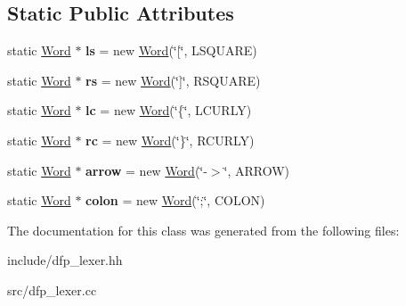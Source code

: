 \subsection*{Static Public Attributes}
\begin{DoxyCompactItemize}
\item 
static \hyperlink{class_d_f_p_1_1_word}{Word} $\ast$ {\bfseries ls} = new \hyperlink{class_d_f_p_1_1_word}{Word}(\char`\"{}\mbox{[}\char`\"{}, L\+S\+Q\+U\+A\+RE)\hypertarget{class_d_f_p_1_1_word_a051ffa7f53cc439afc32f542ac16f5ca}{}\label{class_d_f_p_1_1_word_a051ffa7f53cc439afc32f542ac16f5ca}

\item 
static \hyperlink{class_d_f_p_1_1_word}{Word} $\ast$ {\bfseries rs} = new \hyperlink{class_d_f_p_1_1_word}{Word}(\char`\"{}\mbox{]}\char`\"{}, R\+S\+Q\+U\+A\+RE)\hypertarget{class_d_f_p_1_1_word_aa1666db4d244aec9a7ec3f6ee4d3ba73}{}\label{class_d_f_p_1_1_word_aa1666db4d244aec9a7ec3f6ee4d3ba73}

\item 
static \hyperlink{class_d_f_p_1_1_word}{Word} $\ast$ {\bfseries lc} = new \hyperlink{class_d_f_p_1_1_word}{Word}(\char`\"{}\{\char`\"{}, L\+C\+U\+R\+LY)\hypertarget{class_d_f_p_1_1_word_ab43a22bed9227918e47158aa37074d04}{}\label{class_d_f_p_1_1_word_ab43a22bed9227918e47158aa37074d04}

\item 
static \hyperlink{class_d_f_p_1_1_word}{Word} $\ast$ {\bfseries rc} = new \hyperlink{class_d_f_p_1_1_word}{Word}(\char`\"{}\}\char`\"{}, R\+C\+U\+R\+LY)\hypertarget{class_d_f_p_1_1_word_a420040354de30da67547d0d537d2c0e2}{}\label{class_d_f_p_1_1_word_a420040354de30da67547d0d537d2c0e2}

\item 
static \hyperlink{class_d_f_p_1_1_word}{Word} $\ast$ {\bfseries arrow} = new \hyperlink{class_d_f_p_1_1_word}{Word}(\char`\"{}-\/$>$\char`\"{}, A\+R\+R\+OW)\hypertarget{class_d_f_p_1_1_word_aa6e71e3441f967b6b833d2206ae4324c}{}\label{class_d_f_p_1_1_word_aa6e71e3441f967b6b833d2206ae4324c}

\item 
static \hyperlink{class_d_f_p_1_1_word}{Word} $\ast$ {\bfseries colon} = new \hyperlink{class_d_f_p_1_1_word}{Word}(\char`\"{};\char`\"{}, C\+O\+L\+ON)\hypertarget{class_d_f_p_1_1_word_aa2a31e532e97b963ef604b425f36e456}{}\label{class_d_f_p_1_1_word_aa2a31e532e97b963ef604b425f36e456}

\end{DoxyCompactItemize}


The documentation for this class was generated from the following files\+:\begin{DoxyCompactItemize}
\item 
include/dfp\+\_\+lexer.\+hh\item 
src/dfp\+\_\+lexer.\+cc\end{DoxyCompactItemize}
